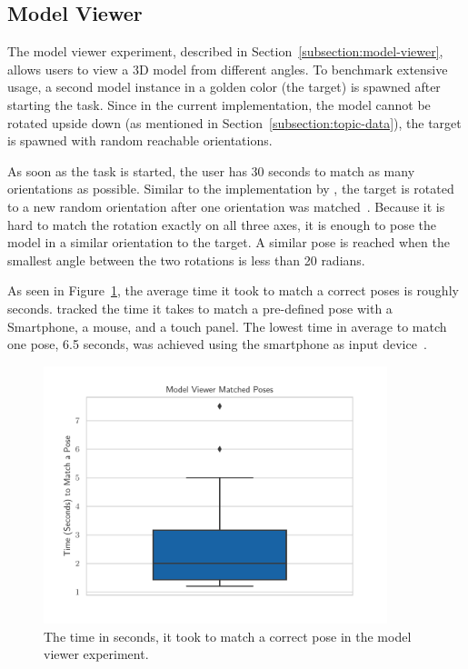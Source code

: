 \subsection{Model Viewer}\label{section:eval-res-mv}

The model viewer experiment, described in Section~\ref{subsection:model-viewer}, allows users to view a \ac{3D} model from different angles. To benchmark extensive usage, a second model instance in a golden color (the target) is spawned after starting the task. Since in the current implementation, the model cannot be rotated upside down (as mentioned in Section~\ref{subsection:topic-data}), the target is spawned with random reachable orientations.

As soon as the task is started, the user has 30 seconds to match as many orientations as possible. Similar to the implementation by \citeauthor{Katzakis.2010}, the target is rotated to a new random orientation after one orientation was matched~\cite[140]{Katzakis.2010}.
Because it is hard to match the rotation exactly on all three axes, it is enough to pose the model in a similar orientation to the target. A similar pose is reached when the smallest angle between the two rotations is less than 20 radians.

As seen in Figure~\ref{fig:eval-exp-mv}, the average time it took to match a correct poses is roughly \evalExpMvAvgPoses{} seconds. \citeauthor{Katzakis.2010} tracked the time it takes to match a pre-defined pose with a Smartphone, a mouse, and a touch panel. The lowest time in average to match one pose, 6.5 seconds, was achieved using the smartphone as input device~\cite[140]{Katzakis.2010}.

\begin{figure}[H]
	\centering
	\includegraphics[width=10cm]{figures/evaluation/eval_exp_mv.pdf}
	\caption[Model viewer task results]{The time in seconds, it took to match a correct pose in the model viewer experiment.}\label{fig:eval-exp-mv}
\end{figure}

